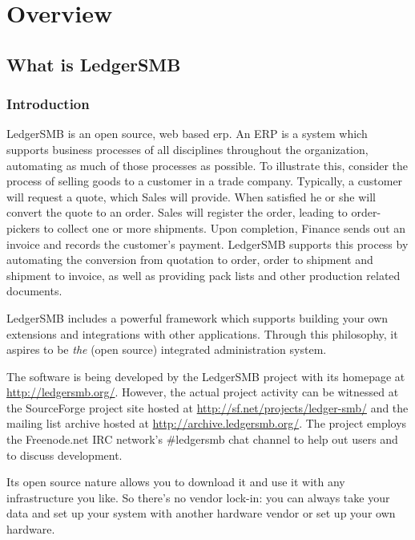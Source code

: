 
\part{Overview}
\label{part-overview}


\chapter{What is LedgerSMB}
\label{cha-what-is-ledgersmb}

\section{Introduction}
\label{sec-ledgersmb-introduction}
LedgerSMB is an open source, web based \gls{erp}. An ERP is a system
which supports business processes of all disciplines throughout the
organization, automating as much of those processes as possible. To
illustrate this, consider the process of selling goods to a customer
in a trade company. Typically, a customer will request a quote, which
Sales will provide. When satisfied he or she will convert the quote
to an order. Sales will register the order, leading to order-pickers
to collect one or more shipments. Upon completion, Finance sends
out an invoice and records the customer's payment. LedgerSMB supports
this process by automating the conversion from quotation to order,
order to shipment and shipment to invoice, as well as providing
pack lists and other production related documents.

LedgerSMB includes a
powerful framework which supports building your own extensions and
integrations with other applications. Through this philosophy, it
aspires to be \emph{the} (open source) integrated administration system.

The software is being developed by the LedgerSMB project with its homepage at \url{http://ledgersmb.org/}.
However, the actual project activity can be witnessed at the SourceForge
project site hosted at \url{http://sf.net/projects/ledger-smb/} and the mailing list archive
hosted at \url{http://archive.ledgersmb.org/}.  The project
employs the Freenode.net IRC network's \#ledgersmb chat channel to help out users and to discuss
development.

Its open source nature allows you to download it and use it with any
infrastructure you like. So there's no vendor lock-in: you can
always take your data and set up your system with another hardware vendor
or set up your own hardware.

